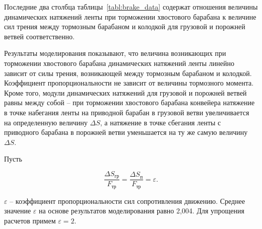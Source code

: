 Последние два столбца таблицы~\ref{tabl:brake_data} содержат отношения величины динамических натяжений ленты при торможении хвостового барабана к величине сил трения между тормозным барабаном и колодкой для грузовой и порожней ветвей соответственно.

Результаты моделирования показывают, что величина возникающих при торможении хвостового барабана динамических натяжений ленты линейно зависит от силы трения, возникающей между тормозным барабаном и колодкой. Коэффициент пропорциональности не зависит от величины тормозного момента. Кроме того, модули динамических натяжений для грузовой и порожней ветвей равны между собой -- при торможении хвостового барабана конвейера натяжение в точке набегания ленты на приводной барабан в грузовой ветви увеличивается на определенную величину $\Delta S $, а натяжение в точке сбегания ленты с приводного барабана в порожней ветви уменьшается на ту же самую величину $\Delta S $.

Пусть

$$ \frac{\Delta S_{\text{гр}}}{F_{\text{тр}}} = \frac{\Delta S_{\text{п}}}{F_{\text{тр}}} = \varepsilon. $$

$ \varepsilon $ -- коэффициент пропорциональности сил сопротивления движению. Среднее значение $ \varepsilon $ на основе результатов моделирования равно 2,004. Для упрощения расчетов примем $ \varepsilon = 2. $

